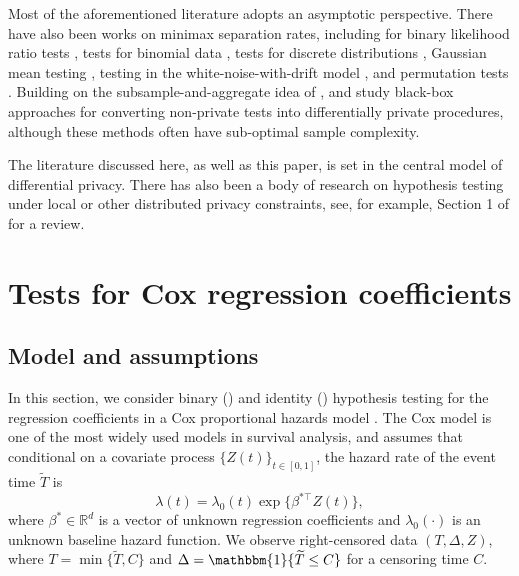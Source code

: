 \documentclass[11pt]{article}
\begin{document}
Most of the aforementioned literature adopts an asymptotic perspective. There have also been works on minimax separation rates, including for binary likelihood ratio tests \citep{canonne2019structure}, tests for binomial data \citep{awan2018binomial}, tests for discrete distributions \citep[e.g.][]{cai2017privit, acharya2018discretedists}, Gaussian mean testing \citep[e.g.][]{pmlr-v178-narayanan22a}, testing in the white-noise-with-drift model \citep{cai2024federatednonparametrichypothesistesting}, and permutation tests \citep{kim2026DPpermutation}. Building on the subsample-and-aggregate idea of \cite{cai2017privit}, \cite{pena2022subsample} and \cite{kazan2023test} study black-box approaches for converting non-private tests into differentially private procedures, although these methods often have sub-optimal sample complexity.

The literature discussed here, as well as this paper, is set in the central model of differential privacy. There has also been a body of research on hypothesis testing under local or other distributed privacy constraints, see, for example, Section 1 of \cite{JMLR:v26:24-2016} for a review. 


\section{Tests for Cox regression coefficients}
\subsection{Model and assumptions}
\label{sec:assumptions}
In this section, we consider binary () and identity () hypothesis testing for the regression coefficients in a Cox proportional hazards model \citep{cox1972regression}. The Cox model is one of the most widely used models in survival analysis, and assumes that conditional on a covariate process $\{Z(t)\}_{t\in[0,1]}$, the hazard rate of the event time $\widetilde T$ is
\begin{equation}\label{eq:hazard}
\lambda(t) = \lambda_0(t)\exp\{\beta^{*\top}Z(t)\},
\end{equation}
where $\beta^*\in\mathbb{R}^d$ is a vector of unknown regression coefficients and $\lambda_0(\cdot)$ is an unknown baseline hazard function. We observe right-censored data $(T, \Delta, Z)$, where $T = \min\{\widetilde{T}, C\}$ and $\Delta = \mathbbm{1}\{\widetilde{T} \leq C\}$ for a censoring time $C$. 
\end{document}
